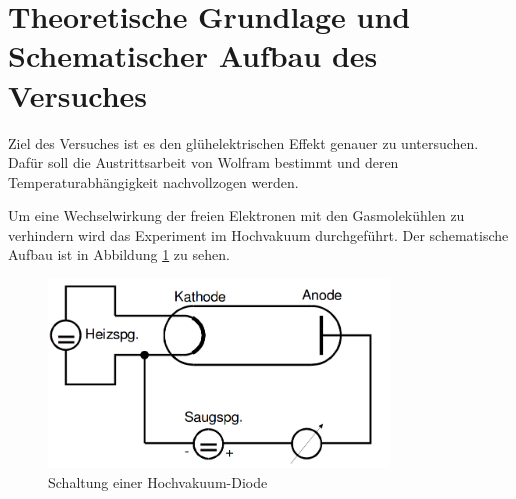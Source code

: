 \section{Theoretische Grundlage und Schematischer Aufbau des Versuches}
\label{sec:Theorie}
Ziel des Versuches ist es den glühelektrischen Effekt genauer zu untersuchen. Dafür soll die Austrittsarbeit von Wolfram bestimmt und deren Temperaturabhängigkeit nachvollzogen werden.

Um eine Wechselwirkung der freien Elektronen mit den Gasmolekühlen zu verhindern wird das Experiment im Hochvakuum durchgeführt. Der schematische Aufbau ist in Abbildung \ref{fig:SHD} zu sehen.

\begin{figure}
  \centering
  \includegraphics[height=5cm]{picture/Diode.png}
  \caption{Schaltung einer Hochvakuum-Diode \cite{pra}}
  \label{fig:SHD}
\end{figure}

